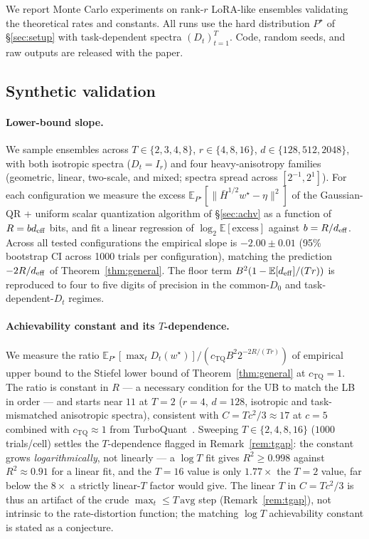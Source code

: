We report Monte Carlo experiments on rank-$r$ LoRA-like
ensembles validating the theoretical rates and constants. All
runs use the hard distribution $P^\star$ of \S\ref{sec:setup}
with task-dependent spectra $(D_t)_{t=1}^T$. Code, random seeds,
and raw outputs are released with the paper.

\subsection{Synthetic validation}\label{subsec:exp-synthetic}\label{subsec:exp-T-synthetic}

\paragraph{Lower-bound slope.} We sample ensembles across
$T\in\{2,3,4,8\}$, $r\in\{4,8,16\}$, $d\in\{128,512,2048\}$,
with both isotropic spectra ($D_t = I_r$) and four
heavy-anisotropy families (geometric, linear,
two-scale, and mixed; spectra spread across
$[2^{-1}, 2^1]$). For each configuration we measure the excess
$\mathbb{E}_{P^\star}[\|\bar H^{1/2}w^\star - \eta\|^2]$ of the
Gaussian-QR + uniform scalar quantization algorithm of
\S\ref{sec:achv} as a function of $R = bd_{\mathrm{eff}}$ bits, and fit a
linear regression of $\log_2\mathbb{E}[\text{excess}]$ against
$b = R/d_{\mathrm{eff}}$. Across all tested configurations the empirical
slope is $-2.00 \pm 0.01$ (95\% bootstrap CI across 1000 trials
per configuration), matching the prediction $-2R/d_{\mathrm{eff}}$ of
Theorem~\ref{thm:general}. The floor term $B^2(1 - \mathbb{E}[d_{\mathrm{eff}}]/
(Tr))$ is reproduced to four to five digits of precision in
the common-$D_0$ and task-dependent-$D_t$ regimes.

\paragraph{Achievability constant and its $T$-dependence.} We measure
the ratio
$\mathbb{E}_{P^\star}[\max_t D_t(w^\star)] / (c_{\mathrm{TQ}}
B^2 2^{-2R/(Tr)})$ of empirical upper bound to the Stiefel
lower bound of Theorem~\ref{thm:general} at $c_{\mathrm{TQ}} = 1$.
The ratio is constant in $R$ — a necessary condition for the UB
to match the LB in order — and starts near $11$ at $T = 2$
($r = 4$, $d = 128$, isotropic and task-mismatched anisotropic
spectra), consistent with $C = Tc^2/3 \approx 17$ at $c = 5$ combined
with $c_{\mathrm{TQ}} \approx 1$ from
TurboQuant~\cite{zandieh2025turboquant}. Sweeping
$T \in \{2, 4, 8, 16\}$ ($1000$ trials/cell) settles the
$T$-dependence flagged in Remark~\ref{rem:tgap}: the constant grows
\emph{logarithmically}, not linearly --- a $\log T$ fit gives
$R^2 \geq 0.998$ against $R^2 \approx 0.91$ for a linear fit, and the
$T{=}16$ value is only $1.77\times$ the $T{=}2$ value, far below the
$8\times$ a strictly linear-$T$ factor would give. The linear $T$ in
$C = Tc^2/3$ is thus an artifact of the crude
$\max_t \leq T\,\mathrm{avg}$ step (Remark~\ref{rem:tgap}), not
intrinsic to the rate-distortion function; the matching $\log T$
achievability constant is stated as a conjecture.

